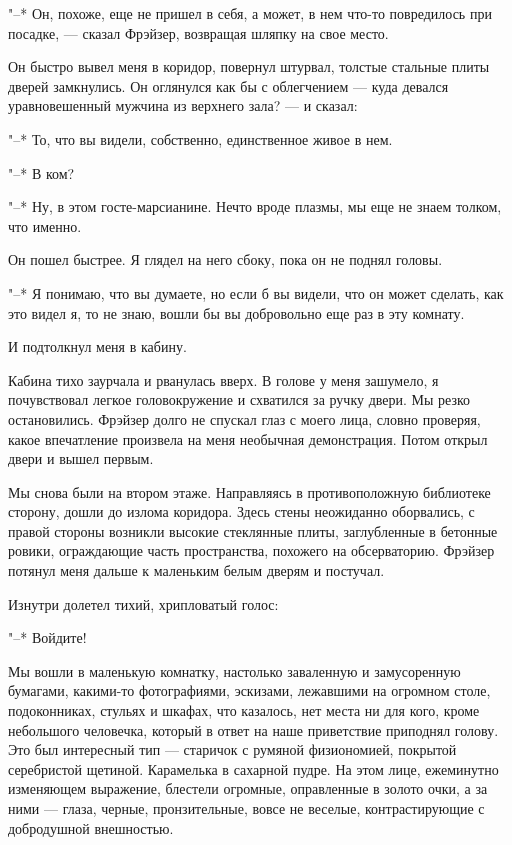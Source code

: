 "--* Он, похоже, еще не пришел в себя, а может, в нем  что-то  повредилось
при посадке, --- сказал Фрэйзер, возвращая шляпку на свое место.

Он быстро вывел меня в  коридор,  повернул  штурвал,  толстые  стальные
плиты дверей замкнулись. Он оглянулся как бы с облегчением --- куда  девался
уравновешенный мужчина из верхнего зала? --- и сказал:

"--* То, что вы видели, собственно, единственное живое в нем.

"--* В ком?

"--* Ну, в этом госте-марсианине. Нечто вроде  плазмы,  мы  еще  не  знаем
толком, что именно.

Он пошел быстрее. Я глядел на него сбоку, пока он не поднял головы.

"--* Я понимаю, что вы думаете, но если б вы видели, что он может сделать,
как это видел я, то не знаю,  вошли  бы  вы  добровольно  еще  раз  в  эту
комнату.

И подтолкнул меня в кабину.

Кабина тихо заурчала и рванулась вверх. В голове  у  меня  зашумело,  я
почувствовал легкое головокружение и схватился за ручку  двери.  Мы  резко
остановились. Фрэйзер долго не спускал глаз с моего лица, словно проверяя,
какое впечатление произвела на меня необычная демонстрация.  Потом  открыл
двери и вышел первым.

Мы снова были на втором этаже. Направляясь в противоположную библиотеке
сторону, дошли до излома коридора. Здесь стены  неожиданно  оборвались,  с
правой стороны возникли высокие стеклянные плиты, заглубленные в  бетонные
ровики, ограждающие часть пространства, похожего на обсерваторию.  Фрэйзер
потянул меня дальше к маленьким белым дверям и постучал.

Изнутри долетел тихий, хрипловатый голос:

"--* Войдите!

Мы вошли в маленькую  комнатку,  настолько  заваленную  и  замусоренную
бумагами, какими-то фотографиями, эскизами, лежавшими на  огромном  столе,
подоконниках, стульях и шкафах, что казалось, нет места ни для кого, кроме
небольшого человечка,  который  в  ответ  на  наше  приветствие  приподнял
голову. Это был интересный тип --- старичок с румяной физиономией,  покрытой
серебристой щетиной. Карамелька в сахарной пудре. На этом лице, ежеминутно
изменяющем выражение, блестели огромные, оправленные в золото очки,  а  за
ними --- глаза, черные, пронзительные, вовсе не веселые,  контрастирующие  с
добродушной внешностью.

